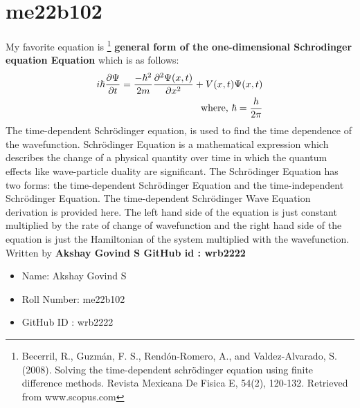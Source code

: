 \section{me22b102}
My favorite equation is \footnote[1]{Becerril, R., Guzmán, F. S., Rendón-Romero, A., and Valdez-Alvarado, S. (2008). Solving the time-dependent schrödinger equation using finite difference methods. Revista Mexicana De Fisica E, 54(2), 120-132. Retrieved from www.scopus.com } \textbf{general form of the one-dimensional  Schr$\mathbf{\ddot{o}}$dinger equation  Equation} which is as follows: 
\begin{eqnarray}
    \label{Schrodinger's equation}
    i\hbar{\partial \Psi \over \partial t} = {- \hbar^2 \over 2m} {\partial^2 \Psi(x,t) \over \partial x^2} + V(x,t)\Psi(x,t)
    \\ \textrm{where, } \hbar = \frac{h}{2 \pi}    
\end{eqnarray}
The time-dependent Schrödinger equation, is used to find the time dependence of the wavefunction.
Schrödinger Equation is a mathematical expression which describes the change of a physical quantity
over time in which the quantum effects like wave-particle duality are significant. The Schrödinger
Equation has two forms: the time-dependent Schrödinger Equation and the time-independent Schrödinger
Equation. The time-dependent Schrödinger Wave Equation derivation is provided here. The left hand side 
of the equation is just constant multiplied by the rate of change of wavefunction and the right hand side 
of the equation is just the Hamiltonian of the system multiplied with the wavefunction. Written by \textbf{Akshay Govind S 
GitHub id : wrb2222}

\begin{itemize}
    \item Name: Akshay Govind S 
    \item Roll Number: me22b102
    \item GitHub ID : wrb2222
\end{itemize}



